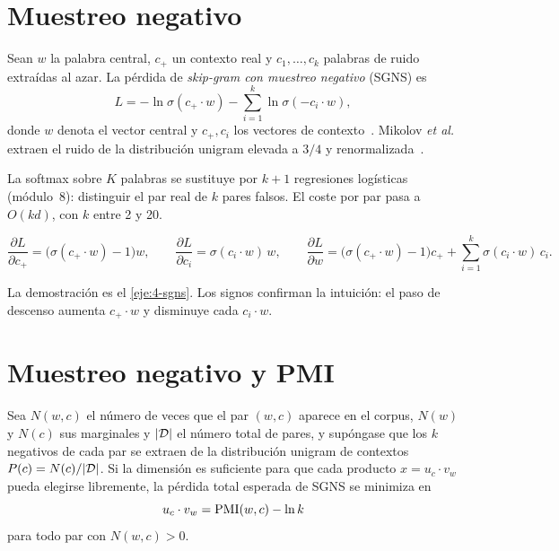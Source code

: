 \section{Muestreo negativo}

\begin{definicion}\label{def:sgns}
Sean $w$ la palabra central, $c_{+}$ un contexto real y $c_{1},\dots,c_{k}$ palabras de ruido extraídas al azar. La pérdida de \emph{skip-gram con muestreo negativo} (SGNS) es
\[
L=-\ln\sigma(c_{+}\cdot w)-\sum_{i=1}^{k}\ln\sigma(-c_{i}\cdot w),
\]
donde $w$ denota el vector central y $c_+,c_i$ los vectores de contexto~\cite[§5.5.2]{jm3}. Mikolov \emph{et al.} extraen el ruido de la distribución unigram elevada a $3/4$ y renormalizada~\cite{mikolov13b}.
\end{definicion}

La softmax sobre $K$ palabras se sustituye por $k+1$ regresiones logísticas (módulo~8): distinguir el par real de $k$ pares falsos. El coste por par pasa a $O(kd)$, con $k$ entre 2 y 20.

\begin{proposicion}\label{prop:grad-sgns}
\[
\frac{\partial L}{\partial c_{+}}=\bigl(\sigma(c_{+}\cdot w)-1\bigr)w,\qquad
\frac{\partial L}{\partial c_{i}}=\sigma(c_{i}\cdot w)\,w,\qquad
\frac{\partial L}{\partial w}=\bigl(\sigma(c_{+}\cdot w)-1\bigr)c_{+}+\sum_{i=1}^{k}\sigma(c_{i}\cdot w)\,c_{i}.
\]
\end{proposicion}

La demostración es el \cref{eje:4-sgns}. Los signos confirman la intuición: el paso de descenso aumenta $c_{+}\cdot w$ y disminuye cada $c_{i}\cdot w$.

\addtocounter{definicion}{1}%

\section{Muestreo negativo y PMI}

\begin{teorema}\label{teo:levy}
Sea $N(w,c)$ el número de veces que el par $(w,c)$ aparece en el corpus, $N(w)$ y $N(c)$ sus marginales y $\lvert\mathcal{D}\rvert$ el número total de pares, y supóngase que los $k$ negativos de cada par se extraen de la distribución unigram de contextos $P(c)=N(c)/\lvert\mathcal{D}\rvert$. Si la dimensión es suficiente para que cada producto $x=u_c\cdot v_w$ pueda elegirse libremente, la pérdida total esperada de SGNS se minimiza en
\[
u_c\cdot v_w=\operatorname{PMI}(w,c)-\ln k
\]
para todo par con $N(w,c)>0$.
\end{teorema}


